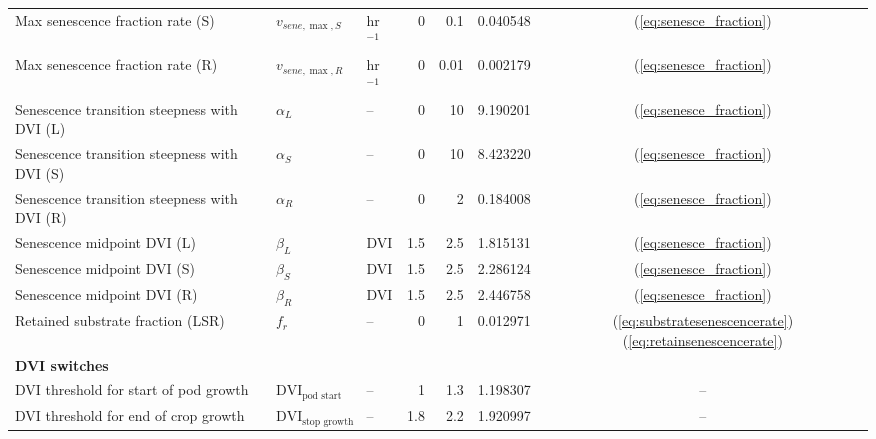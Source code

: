 \begin{table}[H]
\begin{tabular}{lllrrrc}
  Max senescence fraction rate (S) & $v_{sene,\max,S}$ & hr$^{-1}$ & 0 & 0.1 & 0.040548 & (\ref{eq:senesce_fraction}) \\
  Max senescence fraction rate (R) & $v_{sene,\max,R}$ & hr$^{-1}$ & 0 & 0.01 & 0.002179 & (\ref{eq:senesce_fraction}) \\
  Senescence transition steepness with DVI (L) & $\alpha_{L}$ & -- & 0 & 10 & 9.190201 & (\ref{eq:senesce_fraction}) \\
  Senescence transition steepness with DVI (S) & $\alpha_{S}$ & -- & 0 & 10 & 8.423220 & (\ref{eq:senesce_fraction}) \\
  Senescence transition steepness with DVI (R) & $\alpha_{R}$ & -- & 0 & 2 & 0.184008 & (\ref{eq:senesce_fraction}) \\
  Senescence midpoint DVI (L) & $\beta_{L}$ & DVI & 1.5 & 2.5 & 1.815131 & (\ref{eq:senesce_fraction}) \\
  Senescence midpoint DVI (S) & $\beta_{S}$ & DVI & 1.5 & 2.5 & 2.286124 & (\ref{eq:senesce_fraction}) \\
  Senescence midpoint DVI (R) & $\beta_{R}$ & DVI & 1.5 & 2.5 & 2.446758 & (\ref{eq:senesce_fraction}) \\
  Retained substrate fraction (LSR) & $f_{r}$ & -- & 0 & 1 & 0.012971 & (\ref{eq:substratesenescencerate})(\ref{eq:retainsenescencerate}) \\
  \multicolumn{7}{l}{\textbf{DVI switches}} \\
  DVI threshold for start of pod growth & $\text{DVI}_\text{pod start}$ & -- & 1 & 1.3 & 1.198307 & -- \\
  DVI threshold for end of crop growth & $\text{DVI}_\text{stop growth}$ & -- & 1.8 & 2.2 & 1.920997 & -- \\
  \bottomrule
\end{tabular}
\end{table}

